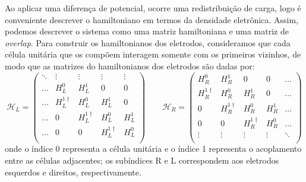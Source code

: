 Ao aplicar uma diferença de potencial, ocorre uma redistribuição de carga, logo é conveniente descrever o hamiltoniano em termos da densidade eletrônica. Assim, podemos descrever o sistema como uma matriz hamiltoniana e uma matriz de \textit{overlap}. Para construir os hamiltonianos dos eletrodos, consideramos que cada célula unitária que os compõem interagem somente com os primeiros vizinhos, de modo que as matrizes do hamiltonianos dos eletrodos são dadas por:
\begin{equation}
	\mathcal{H}_L =\begin{pmatrix}
		\ddots  & \vdots  & \vdots & \vdots & \vdots \\
		\ldots & H_L^0 & H_L^1 & 0 &0  \\
		\ldots & H_L^{1\dagger} & H_L^0 & H_L^1 & 0 \\
		\ldots & 0 & H_L^{1\dagger} & H_L^0 & H_L^1 \\
		\ldots & 0 & 0 & H_L^{1\dagger} & H_L^0 \\
	\end{pmatrix}\qquad 
	\mathcal{H}_R= \begin{pmatrix}
		H_R^0  & H_R^1   & 0 & 0& \ldots \\
		H_R^{1\dagger} & H_R^0 & H_R^1 & 0 &\ldots  \\
		0 & H_R^{1\dagger} & H_R^0 & H_R^1 & \ldots \\
		0 & 0 & H_R^{1\dagger} & H_R^0 & \ldots\\
		\vdots & \vdots & \vdots & \vdots & \ddots \\
	\end{pmatrix}
\end{equation}
onde o índice 0 representa a célula unitária e o índice 1 representa o acoplamento entre as células adjacentes; os subíndices R e L correspondem aos eletrodos esquerdos e direitos, respectivamente.


